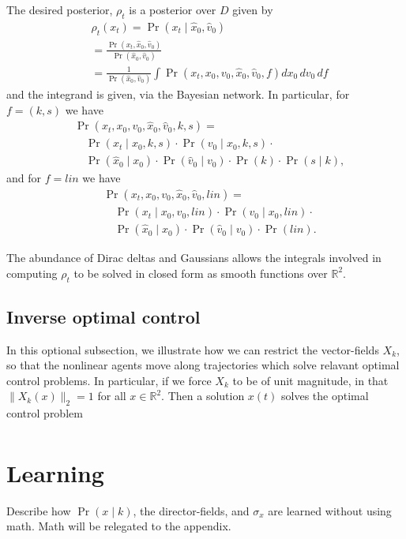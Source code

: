 \documentclass[conference]{IEEEtran}
\begin{document}
The desired posterior, $\rho_t$ is a posterior over $D$ given by
\begin{align*}
	&\rho_t(x_t) = \Pr(x_t \mid \hat{x}_0, \hat{v}_0) \\
		&= \frac{ \Pr( x_t, \hat{x}_0, \hat{v}_0) }{ \Pr( \hat{x}_0, \hat{v}_0 ) } \\
		&= \frac{1}{ \Pr( \hat{x}_0, \hat{v}_0 ) } \int \Pr( x_t , x_0, v_0, \hat{x}_0, \hat{v}_0 , f ) dx_0\, dv_0\, df
\end{align*}
and the integrand is given, via the Bayesian network.
In particular, for $f = (k,s)$ we have
\begin{align*}
	 &\Pr( x_t , x_0, v_0, \hat{x}_0, \hat{v}_0 , k,s) =\\
	 &\quad \Pr( x_t \mid x_0 , k, s) \cdot \Pr( v_0 \mid x_0, k , s ) \cdot \\
	 &\quad \Pr( \hat{x}_0 \mid x_0 ) \cdot \Pr( \hat{v}_0 \mid v_0 ) \cdot \Pr(k) \cdot \Pr(s \mid k),
\end{align*}
and for $f = lin$ we have
\begin{align*}
	 &\Pr( x_t , x_0, v_0, \hat{x}_0, \hat{v}_0 , lin) =\\
	 &\quad \Pr( x_t \mid x_0 , v_0, lin) \cdot \Pr( v_0 \mid x_0, lin ) \cdot \\
	 &\quad \Pr( \hat{x}_0 \mid x_0 ) \cdot \Pr( \hat{v}_0 \mid v_0 ) \cdot \Pr(lin).
\end{align*}

The abundance of Dirac deltas and Gaussians allows the integrals involved in computing $\rho_t$ to be solved in closed form
as smooth functions over $\mathbb{R}^2$.

\subsection{Inverse optimal control}
In this optional subsection, we illustrate how we can restrict the vector-fields $X_k$, so that the nonlinear agents move along trajectories which solve relavant optimal control problems.
In particular, if we force $X_k$ to be of unit magnitude, in that $\| X_k(x) \|_2 = 1$ for all $x \in \mathbb{R}^2$.
Then a solution $x(t)$ solves the optimal control problem
\begin{align*}
	
\end{align*}

\section{Learning} \label{sec:learning}
  Describe how $\Pr(x \mid k)$, the director-fields, and $\sigma_x$ are learned without using math.
  Math will be relegated to the appendix.
  
\end{document}
